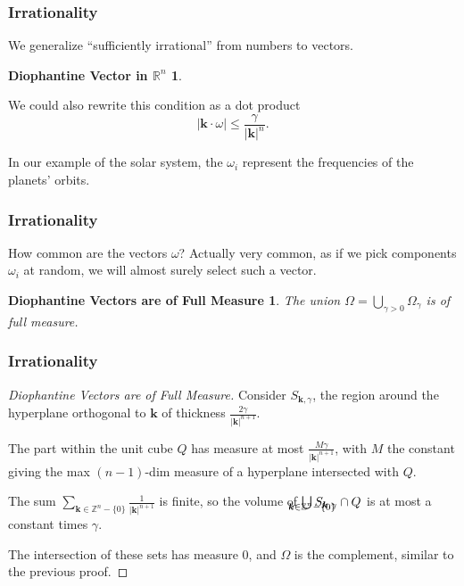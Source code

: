 \documentclass{beamer}
\newcommand{\Z}{\mathbb{Z}}
\newcommand{\bp}[1]{\bm{#1}}
\begin{document}
\begin{frame}
  \frametitle{Irrationality}
  We generalize ``sufficiently irrational'' from numbers to vectors.
  \newtheorem{diovec}{Diophantine Vector in $\mathbb{R}^n$}
  \begin{diovec}
    \diovector{}
  \end{diovec}

  We could also rewrite this condition as a dot product
  \begin{equation*}
    |\bp{k} \cdot \omega| \leq \frac{\gamma}{|\bp{k}|^n}.
  \end{equation*}

  In our example of the solar system, the $\omega_i$ represent the
  frequencies of the planets' orbits.
\end{frame}

\begin{frame}
  \frametitle{Irrationality}
  How common are the vectors $\omega$?
  Actually very common, as if we pick components $\omega_i$ at random, we will
  almost surely select such a vector.
  
  \newtheorem{diomeas}{Diophantine Vectors are of Full Measure}
  \begin{diomeas}
    The union $\Omega = \bigcup_{\gamma > 0} \Omega_{\gamma}$ is of full measure.
  \end{diomeas}
\end{frame}

\begin{frame}
  \frametitle{Irrationality}
  \begin{proof}[Diophantine Vectors are of Full Measure]
    Consider $S_{\bp{k}, \gamma}$, the region around the hyperplane orthogonal
    to $\bp{k}$ of thickness $\frac{2\gamma}{|\bp{k}|^{n+1}}$.
    
    The part within the unit cube $Q$ has measure at most
    $\frac{M\gamma}{|\bp{k}|^{n+1}}$, with $M$ the constant giving the max
    $(n-1)$-dim measure of a hyperplane intersected with $Q$.

    The sum $\sum_{\bp{k} \in \Z^n - \{0\}} \frac{1}{|\bp{k}|^{n+1}}$ is finite,
    so the volume of $\bigcup_{\mathclap{\bp{k} \in \Z^n - \{0\}}} S_{\bp{k}, \gamma}
    \cap Q$ is at most a constant times $\gamma$.

    The intersection of these sets has measure $0$, and $\Omega$ is the
    complement, similar to the previous proof.
  \end{proof}
\end{frame}
\end{document}
